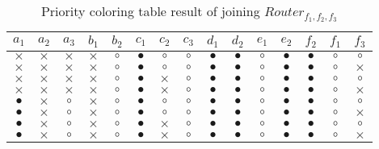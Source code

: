 \begin{BehExample}
\begin{table}
{\setlength\tabcolsep{3.25pt}
\noindent
\begin{tabular}{|c|c|c|c|c|c|c|c|c|c|c|c|c|c|c|}
  \hline
 $a_1$ & $a_2$ & $a_3$ & $b_1$ & $b_2$ & $c_1$ & $c_2$ & $c_3$ & $d_1$ & $d_2$ & $e_1$ & $e_2$ & $f_2$ & $f_1$ & $f_3$ \\ 
\hline
$\times$ & $\times$ & $\times$ & $\times$ & $\circ$ & $\bullet$ & $\circ$ & $\circ$ & $\bullet$ & $\bullet$ & $\circ$ & $\bullet$ & $\bullet$ & $\circ$ & $\circ$ \\ 
\hline
$\times$ & $\times$ & $\times$ & $\times$ & $\circ$ & $\bullet$ & $\circ$ & $\circ$ & $\bullet$ & $\bullet$ & $\circ$ & $\bullet$ & $\bullet$ & $\circ$ & $\times$ \\ 
\hline
$\times$ & $\times$ & $\times$ & $\times$ & $\circ$ & $\bullet$ & $\times$ & $\circ$ & $\bullet$ & $\bullet$ & $\circ$ & $\bullet$ & $\bullet$ & $\circ$ & $\circ$ \\ 
\hline
$\times$ & $\times$ & $\times$ & $\times$ & $\circ$ & $\bullet$ & $\times$ & $\circ$ & $\bullet$ & $\bullet$ & $\circ$ & $\bullet$ & $\bullet$ & $\circ$ & $\times$ \\ 
\hline
$\bullet$ & $\times$ & $\circ$ & $\times$ & $\circ$ & $\bullet$ & $\circ$ & $\circ$ & $\bullet$ & $\bullet$ & $\circ$ & $\bullet$ & $\bullet$ & $\circ$ & $\circ$ \\ 
\hline
$\bullet$ & $\times$ & $\circ$ & $\times$ & $\circ$ & $\bullet$ & $\circ$ & $\circ$ & $\bullet$ & $\bullet$ & $\circ$ & $\bullet$ & $\bullet$ & $\circ$ & $\times$ \\ 
\hline
$\bullet$ & $\times$ & $\circ$ & $\times$ & $\circ$ & $\bullet$ & $\times$ & $\circ$ & $\bullet$ & $\bullet$ & $\circ$ & $\bullet$ & $\bullet$ & $\circ$ & $\circ$ \\ 
\hline
$\bullet$ & $\times$ & $\circ$ & $\times$ & $\circ$ & $\bullet$ & $\times$ & $\circ$ & $\bullet$ & $\bullet$ & $\circ$ & $\bullet$ & $\bullet$ & $\circ$ & $\times$ \\ 
\hline
\end{tabular}
}
\caption{Priority coloring table result of joining $Router_{f_1, f_2, f_3}$}
\label{tab:j7}
\end{table}
%


\end{BehExample}
